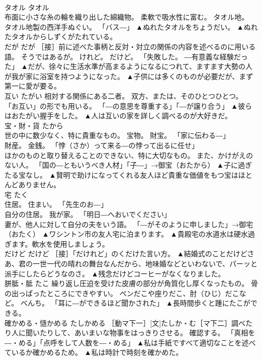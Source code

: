 \documentclass[8pt]{extreport}
\begin{document}
\begin{CJK}{UTF8}{min}
\\	タオル	タオル	
\\	布面に小さな糸の輪を織り出した綿織物。 柔軟で吸水性に富む。 タオル地。 
\\	タオル地製の西洋手ぬぐい。 「バス―」	▲ぬれたタオルをちょうだい。 ▲ぬれたタオルからしずくがたれている。
\\	だが	だが	［接］前に述べた事柄と反対・対立の関係の内容を述べるのに用いる語。 そうではあるが。 けれど。 だけど。 「失敗した。 ―有意義な経験だった」	▲だが、徐々に生活水準が高まるようになるにつれて、ますます大勢の人が我が家に浴室を持つようになった。 ▲子供には多くのものが必要だが、まず第一に愛が要る。
\\	互い	たがい	相対する関係にある二者。 双方、または、そのひとつひとつ。 「お互い」の形でも用いる。 「―の意思を尊重する」「―が譲り合う」	▲彼らはおたがい握手をした。 ▲人は互いの家を詳しく調べるのが大好きだ。
\\	宝・財・貨	たから	
\\	世の中に数少なく、特に貴重なもの。 宝物。 財宝。 「家に伝わる―」 
\\	財産。 金銭。 「悖（さか）って来る―の悖って出るに任せ」 
\\	ほかのものと取り替えることのできない、特に大切なもの。 また、かけがえのない人。 「国の―ともいうべき人材」「子―」→御宝（おたから）	▲子に過ぎたる宝なし。 ▲賢明で助けになってくれる友人ほど貴重な価値をもつ宝はほとんどありません。
\\	宅	たく	
\\	住居。 住まい。 「先生のお―」 
\\	自分の住居。 我が家。 「明日―へおいでください」 
\\	妻が、他人に対して自分の夫をいう語。 「―がそのように申しました」→御宅（おたく）	▲ワシントン市の友人宅に泊まります。 ▲貴殿宅の水道水は硬水過ぎます。軟水を使用しましょう。
\\	だけど	だけど	［接］「だけれど」のくだけた言い方。	▲結婚式のことだけどさあ、君の一世一代の晴れの舞台なんだから、地味婚などといわないで、パーッと派手にしたらどうなのさ。 ▲残念だけどコーヒーがなくなりました。
\\	胼胝・胝	たこ	繰り返し圧迫を受けた皮膚の部分が角質化し厚くなったもの。 骨の出っぱったところにできやすい。 ペンだこや座りだこ、肘（ひじ）だこなど。 べんち。 「耳に―ができるほど聞かされた」	▲長時間歩くと踵にたこができる。
\\	確かめる・慥かめる	たしかめる	［動マ下一］[文]たしか・む［マ下二］調べたり人に聞いたりして、あいまいな物事をはっきりさせる。 確認する。 「真相を―・める」「点呼をして人数を―・める」	▲私は手紙ですべて適切なことを述べているか確かめるため。 ▲私は時計で時刻を確かめた。

\end{CJK}
\end{document}
